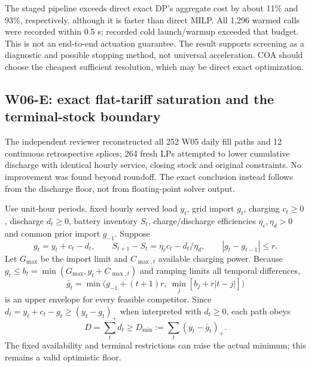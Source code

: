 \documentclass[11pt,letterpaper]{article}
\begin{document}
The staged pipeline exceeds direct exact DP's aggregate cost by about 11\% and 93\%, respectively, although it is faster than direct MILP. All 1,296 warmed calls were recorded within 0.5 s; recorded cold launch/warmup exceeded that budget. This is not an end-to-end actuation guarantee. The result supports screening as a diagnostic and possible stopping method, not universal acceleration. COA should choose the cheapest sufficient resolution, which may be direct exact optimization.

\subsection{W06-E: exact flat-tariff saturation and the terminal-stock boundary}
\label{sec:w06zero}
The independent reviewer reconstructed all 252 W05 daily fill paths and 12 continuous retrospective splices; 264 fresh LPs attempted to lower cumulative discharge with identical hourly service, closing stock and original constraints. No improvement was found beyond roundoff. The exact conclusion instead follows from the discharge floor, not from floating-point solver output.

Use unit-hour periods, fixed hourly served load $y_t$, grid import $g_t$, charging $c_t\ge0$, discharge $d_t\ge0$, battery inventory $S_t$, charge/discharge efficiencies $\eta_c,\eta_d>0$ and common prior import $g_{-1}$. Suppose
\[
 g_t=y_t+c_t-d_t,\qquad S_{t+1}-S_t=\eta_c c_t-d_t/\eta_d,\qquad
 |g_t-g_{t-1}|\le r.
\]
Let $G_{\max}$ be the import limit and $C_{\max,t}$ available charging power. Because $g_t\le b_t=\min(G_{\max},y_t+C_{\max,t})$ and ramping limits all temporal differences,
\[
 \bar g_t=\min\bigl(g_{-1}+(t+1)r,\ \min_j[b_j+r|t-j|]\bigr)
\]
is an upper envelope for every feasible competitor. Since $d_t=y_t+c_t-g_t\ge(y_t-g_t)_+$ when interpreted with $d_t\ge0$, each path obeys
\[
 D=\sum_t d_t\ge D_{\min}:=\sum_t(y_t-\bar g_t)_+ .
\]
The fixed availability and terminal restrictions can raise the actual minimum; this remains a valid optimistic floor.
\end{document}
